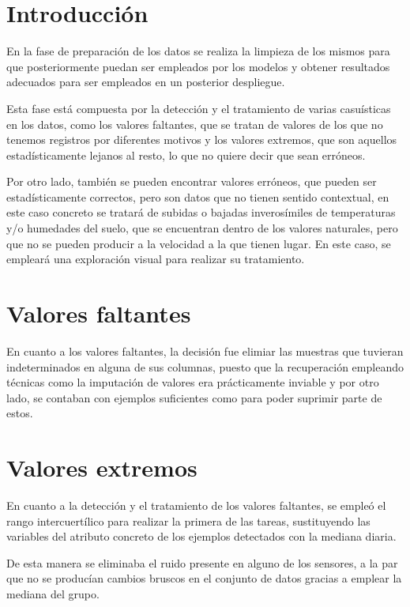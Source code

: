 
\section{Introducción}
En la fase de preparación de los datos se realiza la limpieza de los mismos para 
que posteriormente puedan ser empleados por los modelos y obtener resultados adecuados
para ser empleados en un posterior despliegue.

Esta fase está compuesta por la detección y el tratamiento de varias casuísticas en 
los datos, como los valores faltantes, que se tratan de valores de los que no tenemos
registros por diferentes motivos y los valores extremos, que son aquellos
estadísticamente lejanos al resto, lo que no quiere decir que sean erróneos.

Por otro lado, también se pueden encontrar valores erróneos, que pueden ser 
estadísticamente correctos, pero son datos que no tienen sentido contextual, en este
caso concreto se tratará de subidas o bajadas inverosímiles de temperaturas 
y/o humedades del suelo, que se encuentran dentro de los valores naturales,
pero que no se pueden producir a la velocidad a la que tienen lugar.
En este caso, se empleará una exploración visual para realizar su tratamiento. 

\section{Valores faltantes}
En cuanto a los valores faltantes, la decisión fue elimiar las muestras que tuvieran
indeterminados en alguna de sus columnas, puesto que la recuperación empleando técnicas
como la imputación de valores era prácticamente inviable y por otro lado, se contaban
con ejemplos suficientes como para poder suprimir parte de estos.

\section{Valores extremos}
En cuanto a la detección y el tratamiento de los valores faltantes, se empleó el 
rango intercuertílico para realizar la primera de las tareas, sustituyendo las variables
del atributo concreto de los ejemplos detectados con la mediana diaria.


De esta manera se eliminaba el ruido presente en alguno de los sensores, a la par 
que no se producían cambios bruscos en el conjunto de datos gracias a emplear la 
mediana del grupo.

